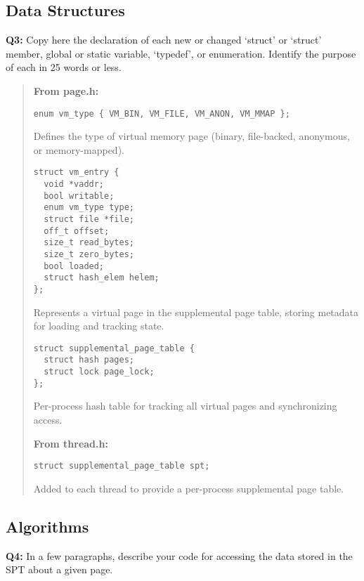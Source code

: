 \documentclass[a4paper,11pt]{paper}
\begin{document}
\subsection{Data Structures}
\textbf{Q3:} Copy here the declaration of each new or changed `struct' or `struct' member, global or static variable, `typedef', or enumeration. Identify the purpose of each in 25 words or less.
\begin{quote}
\textbf{From page.h:}
\begin{verbatim}
enum vm_type { VM_BIN, VM_FILE, VM_ANON, VM_MMAP };
\end{verbatim}
Defines the type of virtual memory page (binary, file-backed, anonymous, or memory-mapped).

\begin{verbatim}
struct vm_entry {
  void *vaddr;
  bool writable;
  enum vm_type type;
  struct file *file;
  off_t offset;
  size_t read_bytes;
  size_t zero_bytes;
  bool loaded;
  struct hash_elem helem;
};
\end{verbatim}
Represents a virtual page in the supplemental page table, storing metadata for loading and tracking state.

\begin{verbatim}
struct supplemental_page_table {
  struct hash pages;
  struct lock page_lock;
};
\end{verbatim}
Per-process hash table for tracking all virtual pages and synchronizing access.

\textbf{From thread.h:}
\begin{verbatim}
struct supplemental_page_table spt;
\end{verbatim}
Added to each thread to provide a per-process supplemental page table.
\end{quote}


\subsection{Algorithms}

\textbf{Q4:} In a few paragraphs, describe your code for accessing the data
stored in the SPT about a given page.
\end{document}
